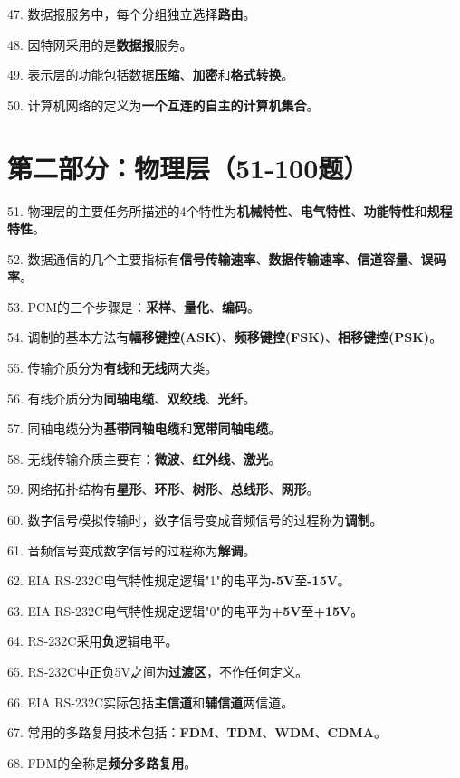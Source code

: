\documentclass[12pt,a4paper,openany]{ctexbook}
\begin{document}
47. 数据报服务中，每个分组独立选择\textbf{路由}。

48. 因特网采用的是\textbf{数据报}服务。

49. 表示层的功能包括数据\textbf{压缩}、\textbf{加密}和\textbf{格式转换}。

50. 计算机网络的定义为\textbf{一个互连的自主的计算机集合}。

\section{第二部分：物理层（51-100题）}

51. 物理层的主要任务所描述的4个特性为\textbf{机械特性}、\textbf{电气特性}、\textbf{功能特性}和\textbf{规程特性}。

52. 数据通信的几个主要指标有\textbf{信号传输速率}、\textbf{数据传输速率}、\textbf{信道容量}、\textbf{误码率}。

53. PCM的三个步骤是：\textbf{采样}、\textbf{量化}、\textbf{编码}。

54. 调制的基本方法有\textbf{幅移键控(ASK)}、\textbf{频移键控(FSK)}、\textbf{相移键控(PSK)}。

55. 传输介质分为\textbf{有线}和\textbf{无线}两大类。

56. 有线介质分为\textbf{同轴电缆}、\textbf{双绞线}、\textbf{光纤}。

57. 同轴电缆分为\textbf{基带同轴电缆}和\textbf{宽带同轴电缆}。

58. 无线传输介质主要有：\textbf{微波}、\textbf{红外线}、\textbf{激光}。

59. 网络拓扑结构有\textbf{星形}、\textbf{环形}、\textbf{树形}、\textbf{总线形}、\textbf{网形}。

60. 数字信号模拟传输时，数字信号变成音频信号的过程称为\textbf{调制}。

61. 音频信号变成数字信号的过程称为\textbf{解调}。

62. EIA RS-232C电气特性规定逻辑"1"的电平为\textbf{-5V}至\textbf{-15V}。

63. EIA RS-232C电气特性规定逻辑"0"的电平为\textbf{+5V}至\textbf{+15V}。

64. RS-232C采用\textbf{负}逻辑电平。

65. RS-232C中正负5V之间为\textbf{过渡区}，不作任何定义。

66. EIA RS-232C实际包括\textbf{主信道}和\textbf{辅信道}两信道。

67. 常用的多路复用技术包括：\textbf{FDM}、\textbf{TDM}、\textbf{WDM}、\textbf{CDMA}。

68. FDM的全称是\textbf{频分多路复用}。
\end{document}

